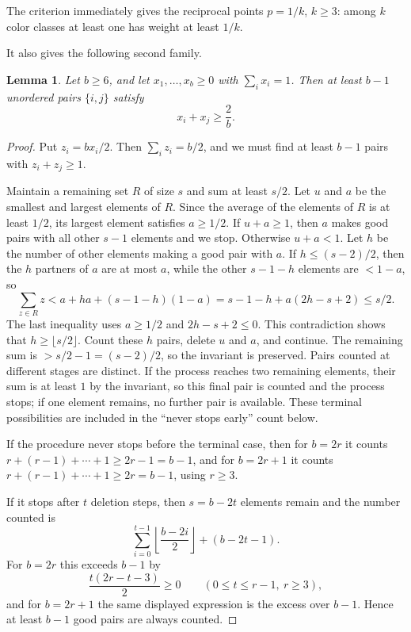 \documentclass[12pt]{article}
\newtheorem{lemma}{Lemma}
\begin{document}
The criterion immediately gives the reciprocal points \(p=1/k\), \(k\ge3\):
among \(k\) color classes at least one has weight at least \(1/k\).

It also gives the following second family.

\begin{lemma}\label{lem:pairs}
Let \(b\ge6\), and let \(x_1,\ldots,x_b\ge0\) with \(\sum_i x_i=1\).  Then at
least \(b-1\) unordered pairs \(\{i,j\}\) satisfy
\[
       x_i+x_j\ge \frac2b .
\]
\end{lemma}

\begin{proof}
Put \(z_i=bx_i/2\).  Then \(\sum_i z_i=b/2\), and we must find at least
\(b-1\) pairs with \(z_i+z_j\ge1\).

Maintain a remaining set \(R\) of size \(s\) and sum at least \(s/2\).  Let
\(u\) and \(a\) be the smallest and largest elements of \(R\).  Since the
average of the elements of \(R\) is at least \(1/2\), its largest element
satisfies \(a\ge1/2\).  If \(u+a\ge1\), then \(a\) makes good pairs with all
other \(s-1\) elements and we stop.  Otherwise \(u+a<1\).  Let \(h\) be the
number of other elements making a good pair with \(a\).  If \(h\le(s-2)/2\),
then the \(h\) partners of \(a\) are at most \(a\), while the other \(s-1-h\)
elements are \(<1-a\), so
\[
 \sum_{z\in R}z
   < a+ha+(s-1-h)(1-a)
   =s-1-h+a(2h-s+2)\le s/2.
\]
The last inequality uses \(a\ge1/2\) and \(2h-s+2\le0\).  This contradiction
shows that \(h\ge\lfloor s/2\rfloor\).  Count these \(h\) pairs, delete \(u\)
and \(a\), and continue.  The remaining sum is
\(>s/2-1=(s-2)/2\), so the invariant is preserved.  Pairs counted at different
stages are distinct.  If the process reaches two remaining elements, their sum is
at least \(1\) by the invariant, so this final pair is counted and the process
stops; if one element remains, no further pair is available.  These terminal
possibilities are included in the ``never stops early'' count below.

If the procedure never stops before the terminal case, then for \(b=2r\) it
counts
\(r+(r-1)+\cdots+1\ge2r-1=b-1\), and for \(b=2r+1\) it counts
\(r+(r-1)+\cdots+1\ge2r=b-1\), using \(r\ge3\).

If it stops after \(t\) deletion steps, then \(s=b-2t\) elements remain and the
number counted is
\[
       \sum_{i=0}^{t-1}\left\lfloor \frac{b-2i}{2}\right\rfloor+(b-2t-1).
\]
For \(b=2r\) this exceeds \(b-1\) by
\[
       \frac{t(2r-t-3)}{2}\ge0\qquad(0\le t\le r-1,\ r\ge3),
\]
and for \(b=2r+1\) the same displayed expression is the excess over \(b-1\).
Hence at least \(b-1\) good pairs are always counted.
\end{proof}
\end{document}
